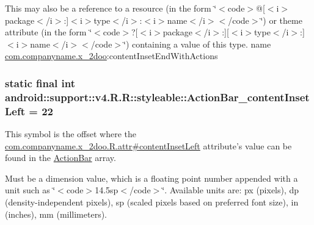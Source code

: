 This may also be a reference to a resource (in the form \char`\"{}$<$code$>$@\mbox{[}$<$i$>$package$<$/i$>$:\mbox{]}$<$i$>$type$<$/i$>$:$<$i$>$name$<$/i$>$$<$/code$>$\char`\"{}) or theme attribute (in the form \char`\"{}$<$code$>$?\mbox{[}$<$i$>$package$<$/i$>$:\mbox{]}\mbox{[}$<$i$>$type$<$/i$>$:\mbox{]}$<$i$>$name$<$/i$>$$<$/code$>$\char`\"{}) containing a value of this type.  name \hyperlink{namespacecom_1_1companyname_1_1x__2doo}{com.companyname.x\_\-2doo}:contentInsetEndWithActions \hypertarget{classandroid_1_1support_1_1v4_1_1_r_1_1styleable_22de0174bc46d66158777df4487ee6d2}{
\subsubsection[{ActionBar\_\-contentInsetLeft}]{\setlength{\rightskip}{0pt plus 5cm}static final int android::support::v4.R.R::styleable::ActionBar\_\-contentInsetLeft = 22}}
\label{classandroid_1_1support_1_1v4_1_1_r_1_1styleable_22de0174bc46d66158777df4487ee6d2}


This symbol is the offset where the \hyperlink{classcom_1_1companyname_1_1x__2doo_1_1_r_1_1attr_6c3ee0e73b74ea9e227ad51936654195}{com.companyname.x\_\-2doo.R.attr\#contentInsetLeft} attribute's value can be found in the \hyperlink{classandroid_1_1support_1_1v4_1_1_r_1_1styleable_5c6cf2c83551ebae05f365bb913fdddf}{ActionBar} array.

Must be a dimension value, which is a floating point number appended with a unit such as \char`\"{}$<$code$>$14.5sp$<$/code$>$\char`\"{}. Available units are: px (pixels), dp (density-independent pixels), sp (scaled pixels based on preferred font size), in (inches), mm (millimeters). 

